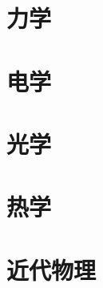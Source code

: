 \documentclass{../paper}
\begin{document}
\begin{titlepage}
  \thispagestyle{empty}
  
  \null
\end{titlepage}

\tableofcontents
\clearpage

\section{力学}
\clearpage
\clearpage
\clearpage
\clearpage
\clearpage
\clearpage
\clearpage
\clearpage
\clearpage
\clearpage
\clearpage

\clearpage
\section{电学}
\clearpage
\clearpage
\clearpage
\clearpage
\clearpage
\clearpage
\clearpage
\clearpage
\clearpage
\clearpage
\clearpage
\clearpage
\section{光学}
\clearpage
\clearpage
\section{热学}
\clearpage
\clearpage
\clearpage
\clearpage
\section{近代物理}
\clearpage
\clearpage
\clearpage
\clearpage
\end{document}
